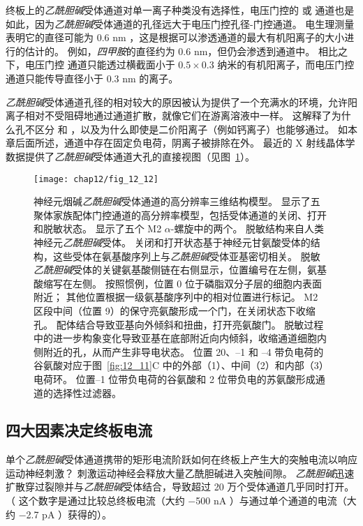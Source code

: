终板上的\textit{乙酰胆碱}受体通道对单一离子种类没有选择性，电压门控的  或  通道也是如此，因为\textit{乙酰胆碱}受体通道的孔径远大于电压门控孔径-门控通道。
电生理测量表明它的直径可能为 0.6 nm ，这是根据可以渗透通道的最大有机阳离子的大小进行的估计的。
例如，\textit{四甲胺}的直径约为 0.6 nm，但仍会渗透到通道中。
相比之下，电压门控  通道只能透过横截面小于 $ 0.5 \times 0.3 $ 纳米的有机阳离子，而电压门控  通道只能传导直径小于 0.3 nm 的离子。


\textit{乙酰胆碱}受体通道孔径的相对较大的原因被认为提供了一个充满水的环境，允许阳离子相对不受阻碍地通过通道扩散，就像它们在游离溶液中一样。
这解释了为什么孔不区分  和 ，以及为什么即使是二价阳离子（例如钙离子）也能够通过。
如本章后面所述，通道中存在固定负电荷，阴离子被排除在外。
最近的 X 射线晶体学数据提供了\textit{乙酰胆碱}受体通道大孔的直接视图（见图~\ref{fig:12_12}）。


\begin{figure}[htbp]
	\centering
	\texttt{[image: chap12/fig\_12\_12]}
	\caption{神经元烟碱\textit{乙酰胆碱}受体通道的高分辨率三维结构模型。
		显示了五聚体家族配体门控通道的高分辨率模型，包括受体通道的关闭、打开和脱敏状态。
		显示了五个 M2 $\alpha$-螺旋中的两个。
		脱敏结构来自人类神经元\textit{乙酰胆碱}受体。
		关闭和打开状态基于神经元甘氨酸受体的结构，这些受体在氨基酸序列上与\textit{乙酰胆碱}受体亚基密切相关。
		脱敏\textit{乙酰胆碱}受体的关键氨基酸侧链在右侧显示，位置编号在左侧，氨基酸缩写在左侧。
		按照惯例，位置 0 位于磷脂双分子层的细胞内表面附近；
		其他位置根据一级氨基酸序列中的相对位置进行标记。
		M2 区段中间（位置 9）的保守亮氨酸形成一个门，在关闭状态下收缩孔。
		配体结合导致亚基向外倾斜和扭曲，打开亮氨酸门。
		脱敏过程中的进一步构象变化导致亚基在底部附近向内倾斜，收缩通道细胞内侧附近的孔，从而产生非导电状态。
		位置 20、–1 和 –4 带负电荷的谷氨酸对应于图~\ref{fig:12_11}C 中的外部（1）、中间（2）和内部（3） 电荷环。
		位置–1 位带负电荷的谷氨酸和 2 位带负电的苏氨酸形成通道的选择性过滤器\cite{morales2016x}。}
	\label{fig:12_12}
\end{figure}



\subsection{四大因素决定终板电流}

单个\textit{乙酰胆碱}受体通道携带的矩形电流阶跃如何在终板上产生大的突触电流以响应运动神经刺激？
刺激运动神经会释放大量乙酰胆碱进入突触间隙。
\textit{乙酰胆碱}迅速扩散穿过裂隙并与\textit{乙酰胆碱}受体结合，导致超过 20 万个受体通道几乎同时打开。
（ 这个数字是通过比较总终板电流（大约 −500 nA ）与通过单个通道的电流（大约 −2.7 pA ）获得的）。


